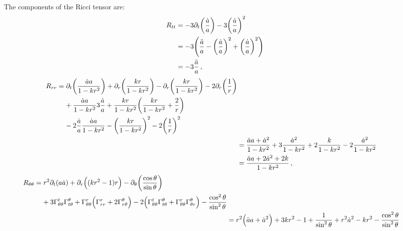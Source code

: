 \documentclass[main.tex]{subfiles}
\begin{document}
\begin{claim}
The components of the Ricci tensor are: 
%
\begin{subequations}
\begin{align}
R_{tt} &= - 3 \partial_{t} \qty(\frac{\dot{a}}{a})
- 3 \qty(\frac{\dot{a}}{a})^2  \\
&=-3 \qty(\frac{\ddot{a}}{a} - \qty(\frac{\dot{a}}{a})^2
+ \qty(\frac{\dot{a}}{a})^2)  \\
&= -3 \frac{\ddot{a}}{a}
\,,
\end{align} 
\end{subequations}
%
\begin{subequations}
\begin{align}
\begin{split}
R_{rr} &= \partial_{t} \qty(\frac{\dot{a} a}{1 - kr^2} )
+ \partial_{r} \qty(\frac{kr}{1 - kr^2})
- \partial_{r} \qty(\frac{kr}{1 - kr^2})
- 2 \partial_{r} \qty(\frac{1}{r}) \\
&\phantom{=}\ 
+ \frac{\dot{a} a}{1 - kr^2} 3 \frac{\dot{a}}{a}
+ \frac{kr}{1-kr^2} \qty(\frac{kr }{1 - kr^2} + \frac{2}{r}) \\
&\phantom{=}\ 
- 2 \frac{\dot{a}}{a} \frac{\dot{a} a}{1 - kr^2}
- \qty(\frac{kr}{1 - kr^2})^2 
- 2 \qty(\frac{1}{r})^2
\end{split}  \\
&= \frac{\ddot{a} a + \dot{a}^2}{1 - kr^2} 
+ 3 \frac{\dot{a}^2}{1 - kr^2}
+ 2 \frac{k}{1 - kr^2}
- 2 \frac{\dot{a}^2}{1 - kr^2}  \\
&= \frac{\ddot{a} a + 2 \dot{a}^2 + 2 k}{1 - kr^2}
\,,
\end{align}
\end{subequations}
%
\begin{subequations}
\begin{align}
\begin{split}
R_{\theta \theta } &= 
r^2 \partial_{t} \qty(a \dot{a})
+ \partial_{r} \qty((kr^2-1)r)
- \partial_{\theta } \qty(\frac{\cos \theta }{\sin \theta }) \\
&\phantom{=}\ 
+3 \Gamma^{t}_{\theta \theta } \Gamma^{\theta }_{t \theta } + \Gamma^{r}_{\theta \theta } \qty(\Gamma^{r}_{r r } + 2 \Gamma^{\theta }_{r \theta })
-2 \qty(\Gamma^{t}_{\theta \theta } \Gamma^{\theta }_{t \theta } + \Gamma^{r}_{\theta \theta } \Gamma^{\theta }_{\theta r}) - \frac{\cos^2 \theta}{\sin^2\theta }
\end{split}  \\
&= r^2 \qty(\ddot{a} a + \dot{a}^2)
+ 3kr^2 - 1 + \frac{1}{\sin^2\theta} 
+  r^2 \dot{a}^2
- kr^2
- \frac{\cos^2\theta }{\sin^2\theta }  \\

\end{align}
\end{subequations}
\end{claim}
\end{document}

